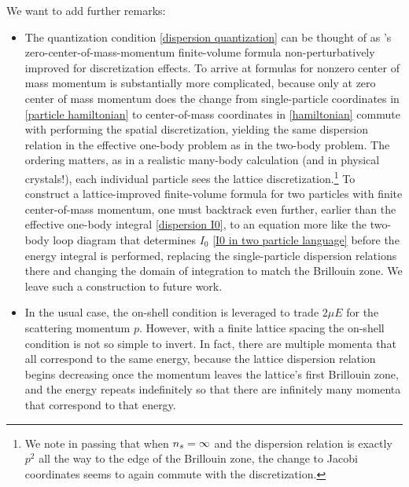 We want to add further remarks:
\begin{itemize}
\item The quantization condition \eqref{dispersion quantization} can be thought of as \Luscher's zero-center-of-mass-momentum finite-volume formula non-perturbatively improved for discretization effects.
To arrive at formulas for nonzero center of mass momentum is substantially more complicated, because only at zero center of mass momentum does the change from single-particle coordinates in \eqref{particle hamiltonian} to center-of-mass coordinates in \eqref{hamiltonian} commute with performing the spatial discretization, yielding the same dispersion relation in the effective one-body problem as in the two-body problem.
The ordering matters, as in a realistic many-body calculation (and in physical crystals!), each individual particle sees the lattice discretization.\footnote{
We note in passing that when ${n_s}=\infty$ and the dispersion relation is exactly $p^2$ all the way to the edge of the Brillouin zone, the change to Jacobi coordinates seems to again commute with the discretization.}
To construct a lattice-improved finite-volume formula for two particles with finite center-of-mass momentum, one must backtrack even further, earlier than the effective one-body integral \eqref{dispersion I0}, to an equation more like the two-body loop diagram that determines $I_0$ \eqref{I0 in two particle language} before the energy integral is performed, replacing the single-particle dispersion relations there and changing the domain of integration to match the Brillouin zone.
We leave such a construction to future work.

\item In the usual case, the on-shell condition is leveraged to trade $2\mu E$ for the scattering momentum $p$.
However, with a finite lattice spacing the on-shell condition is not so simple to invert.
In fact, there are multiple momenta that all correspond to the same energy, because the lattice dispersion relation begins decreasing once the momentum leaves the lattice's first Brillouin zone, and the energy repeats indefinitely so that there are infinitely many momenta that correspond to that energy.



\end{itemize}
